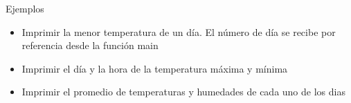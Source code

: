 \documentclass[xcolor=pdftex,table,11pt]{beamer}
\begin{document}
\begin{frame}[allowframebreaks]{Ejemplos}
\begin{enumerate}
\begin{itemize}
          \item Imprimir la menor temperatura de un día. El número de día se recibe por referencia desde la función main
          
          \item Imprimir el día y la hora de la temperatura máxima y mínima
          
          \item Imprimir el promedio de temperaturas y humedades de cada uno de los dias

     
      \end{itemize}
\href{https://github.com/danis963/informaticaI_IUA/blob/main/c/src/7-funcion_triangulo.c}{}


\end{enumerate}

\end{frame}
\end{document}
